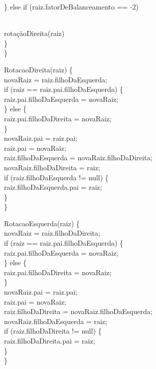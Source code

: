 \documentclass{article}
\begin{document}
\indent \} else if (raiz.fatorDeBalanceamento == -2) { \\
\indent\indent rotaçãoDireita(raiz) \\
\indent \} \\
\}

RotacaoDireita(raiz) \{ \\
\indent novaRaiz = raiz.filhoDaEsquerda; \\
\indent if (raiz == raiz.pai.filhoDaEsquerda) \{ \\
\indent\indent raiz.pai.filhoDaEsquerda = novaRaiz; \\
\indent \} else \{ \\
\indent\indent raiz.pai.filhoDaDireita = novaRaiz; \\
\indent \} \\ 
\indent novaRaiz.pai = raiz.pai; \\
\indent raiz.pai = novaRaiz; \\
\indent raiz.filhoDaEsquerda = novaRaiz.filhoDaDireita; \\
\indent novaRaiz.filhoDaDireita = raiz; \\
\indent if (raiz.filhoDaEsquerda != null) \{ \\
\indent\indent raiz.filhoDaEsquerda.pai = raiz; \\
\indent \} \\
\} 

RotacaoEsquerda(raiz) \{ \\
\indent novaRaiz = raiz.filhoDaDireita; \\
\indent if (raiz == raiz.pai.filhoDaEsquerda) \{ \\
\indent\indent raiz.pai.filhoDaEsquerda = novaRaiz; \\
\indent \} else \{ \\
\indent\indent raiz.pai.filhoDaDireita = novaRaiz; \\
\indent \} \\
\indent novaRaiz.pai = raiz.pai; \\ 
\indent raiz.pai = novaRaiz; \\
\indent raiz.filhoDaDireita = novaRaiz.filhoDaEsquerda; \\
\indent novaRaiz.filhoDaEsquerda = raiz; \\
\indent if (raiz.filhoDaDireita != null) \{ \\
\indent\indent raiz.filhoDaDireita.pai = raiz; \\
\indent    \} \\
\} \\

}
\end{document}
